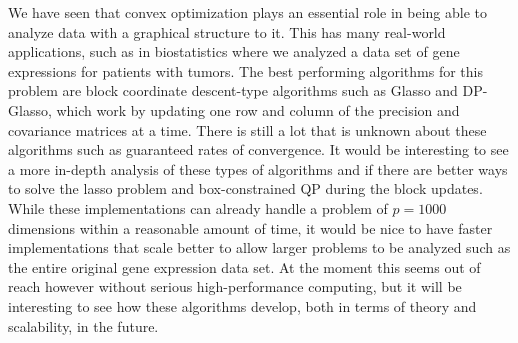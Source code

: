 \documentclass[10pt, letterpaper]{article}
\begin{document}
We have seen that convex optimization plays an essential role in being able to analyze data with a graphical structure to it.  This has many real-world applications, such as in biostatistics where we analyzed a data set of gene expressions for patients with tumors.  The best performing algorithms for this problem are block coordinate descent-type algorithms such as Glasso and DP-Glasso, which work by updating one row and column of the precision and covariance matrices at a time.  There is still a lot that is unknown about these algorithms such as guaranteed rates of convergence.  It would be interesting to see a more in-depth analysis of these types of algorithms and if there are better ways to solve the lasso problem and box-constrained QP during the block updates.  While these implementations can already handle a problem of $p=1000$ dimensions within a reasonable amount of time, it would be nice to have faster implementations that scale better to allow larger problems to be analyzed such as the entire original gene expression data set.  At the moment this seems out of reach however without serious high-performance computing, but it will be interesting to see how these algorithms develop, both in terms of theory and scalability, in the future.



\nocite{*}



\newpage

\newpage

\newpage

\newpage

\newpage

\end{document}
